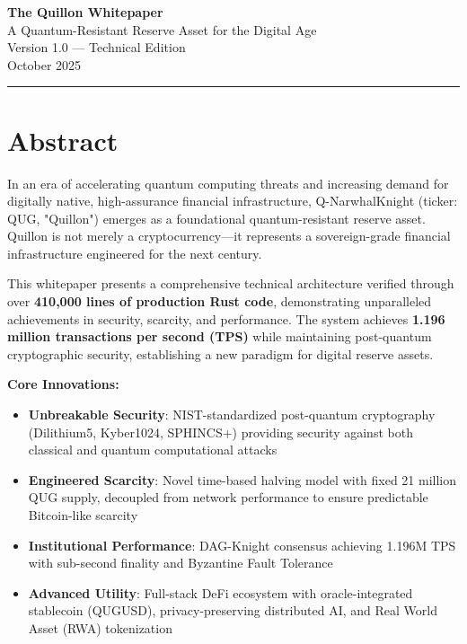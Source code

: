\documentclass[11pt,a4paper]{scrartcl}
\begin{document}
\begin{center}
{\Huge\bfseries The Quillon Whitepaper}\\[8pt]
{\LARGE A Quantum-Resistant Reserve Asset for the Digital Age}\\[12pt]
{\large Version 1.0 --- Technical Edition}\\[4pt]
{\normalsize October 2025}\\[12pt]
\rule{\textwidth}{0.4pt}
\end{center}

\vspace{1em}

\section*{Abstract}

In an era of accelerating quantum computing threats and increasing demand for digitally native, high-assurance financial infrastructure, Q-NarwhalKnight (ticker: QUG, "Quillon") emerges as a foundational quantum-resistant reserve asset. Quillon is not merely a cryptocurrency—it represents a sovereign-grade financial infrastructure engineered for the next century.

This whitepaper presents a comprehensive technical architecture verified through over \textbf{410,000 lines of production Rust code}, demonstrating unparalleled achievements in security, scarcity, and performance. The system achieves \textbf{1.196 million transactions per second (TPS)} while maintaining post-quantum cryptographic security, establishing a new paradigm for digital reserve assets.

\textbf{Core Innovations:}
\begin{itemize}
\item \textbf{Unbreakable Security}: NIST-standardized post-quantum cryptography (Dilithium5, Kyber1024, SPHINCS+) providing security against both classical and quantum computational attacks
\item \textbf{Engineered Scarcity}: Novel time-based halving model with fixed 21 million QUG supply, decoupled from network performance to ensure predictable Bitcoin-like scarcity
\item \textbf{Institutional Performance}: DAG-Knight consensus achieving 1.196M TPS with sub-second finality and Byzantine Fault Tolerance
\item \textbf{Advanced Utility}: Full-stack DeFi ecosystem with oracle-integrated stablecoin (QUGUSD), privacy-preserving distributed AI, and Real World Asset (RWA) tokenization
\end{itemize}
\end{document}
